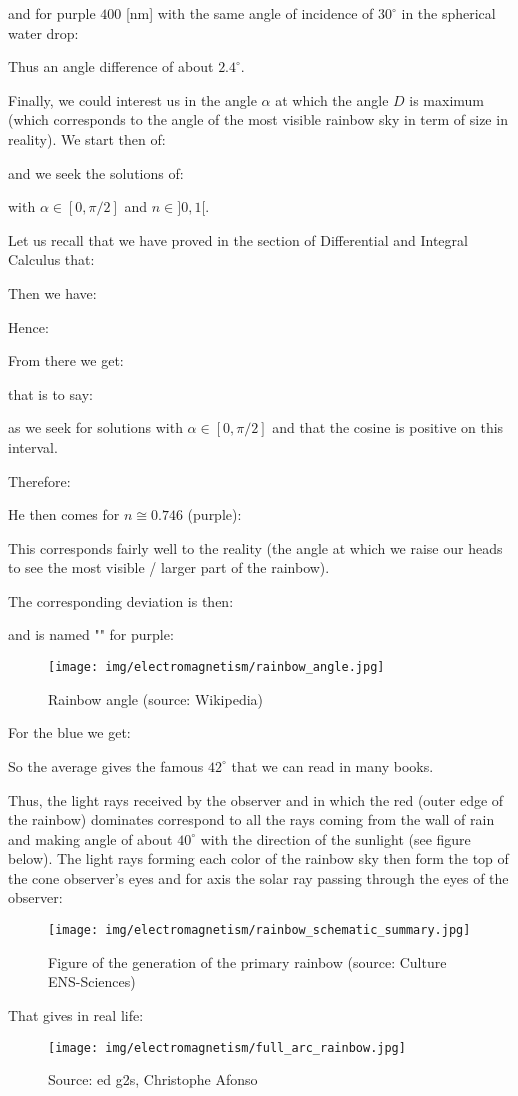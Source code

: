 	and for purple $400$ [nm] with the same angle of incidence of $30^\circ$ in the spherical water drop:
	
	Thus an angle difference of about $2.4^\circ$.
	
	Finally, we could interest us in the angle $\alpha$ at which the angle $D$ is maximum (which corresponds to the angle of the most visible rainbow sky in term of size in reality). We start then of:
	
	and we seek the solutions of:
	
	with $\alpha\in[0,\pi/2]$ and $n\in]0,1[.$

	Let us recall that we have proved in the section of Differential and Integral Calculus that:
	
	Then we have:
	
	Hence:
	
	From there we get:
	
	that is to say:
	
	as we seek for solutions with $\alpha\in[0,\pi/2]$ and that the cosine is positive on this interval.

	Therefore:
	
	He then comes for $n\cong0.746$ (purple):
	
	This corresponds fairly well to the reality (the angle at which we raise our heads to see the most visible / larger part of the rainbow).
	
	The corresponding deviation is then:
	
	and is named "" for purple:
	\begin{figure}[H]
		\centering
		\texttt{[image: img/electromagnetism/rainbow\_angle.jpg]}
		\caption[Rainbow angle]{Rainbow angle (source: Wikipedia)}
	\end{figure}
	For the blue we get:
	
	So the average gives the famous $42^\circ$ that we can read in many books.
	
	Thus, the light rays received by the observer and in which the red (outer edge of the rainbow) dominates correspond to all the rays coming from the wall of rain and making angle of about $40^\circ$ with the direction of the sunlight (see figure below). The light rays forming each color of the rainbow sky then form the top of the cone observer's eyes and for axis the solar ray passing through the eyes of the observer:
	\begin{figure}[H]
		\centering
		\texttt{[image: img/electromagnetism/rainbow\_schematic\_summary.jpg]}
		\caption[]{Figure of the generation of the primary rainbow (source: Culture ENS-Sciences)}
	\end{figure}
	That gives in real life:
	\begin{figure}[H]
		\centering
		\texttt{[image: img/electromagnetism/full\_arc\_rainbow.jpg]}
		\caption[]{Source: ed g2s, Christophe Afonso}
	\end{figure}
	
